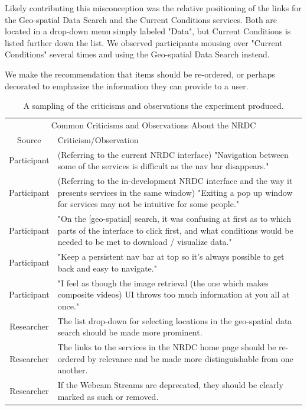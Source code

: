 \documentclass{acm_proc_article-sp}
\begin{document}
Likely contributing this misconception was the relative positioning of the links for the Geo-spatial Data Search and the Current Conditions services. Both are located in a drop-down menu simply labeled "Data", but Current Conditions is listed further down the list. We observed participants mousing over "Current Conditions" several times and using the Geo-spatial Data Search instead.

We make the recommendation that items should be re-ordered, or perhaps decorated to emphasize the information they can provide to a user.

\begin{table}
    \centering
    \begin{tabular}{| c | p{15cm} |}
    \hline
    \multicolumn{2}{|c|}{Common Criticisms and Observations About the NRDC} \\
    Source & Criticism/Observation \\
    \hline
    \hline
    Participant & (Referring to the current NRDC interface) "Navigation between some of the services is difficult as the nav bar disappears." \\
    \hline
    Participant & (Referring to the in-development NRDC interface and the way it presents services in the same window) "Exiting a pop up window for services may not be intuitive for some people." \\
    \hline
    Participant & "On the [geo-spatial] search, it was confusing at first as to which parts of the interface to click first, and what conditions would be needed to be met to download / visualize data." \\
    \hline
    Participant & "Keep a persistent nav bar  at top so it's always possible to get back and easy to navigate." \\
    \hline
    Participant & "I feel as though the image retrieval (the one which makes composite videos) UI throws too much information at you all at once." \\
    \hline
    Researcher  & The list drop-down for selecting locations in the geo-spatial data search should be made more prominent. \\
    \hline
    Researcher  & The links to the services in the NRDC home page should be re-ordered by relevance and be made more distinguishable from one another. \\
    \hline
    Researcher  & If the Webcam Streams are deprecated, they should be clearly marked as such or removed. \\
    \hline
    \end{tabular}
    
    \caption{A sampling of the criticisms and observations the experiment produced.}
    \label{tab:criticisms_observations}
\end{table}
\end{document}
